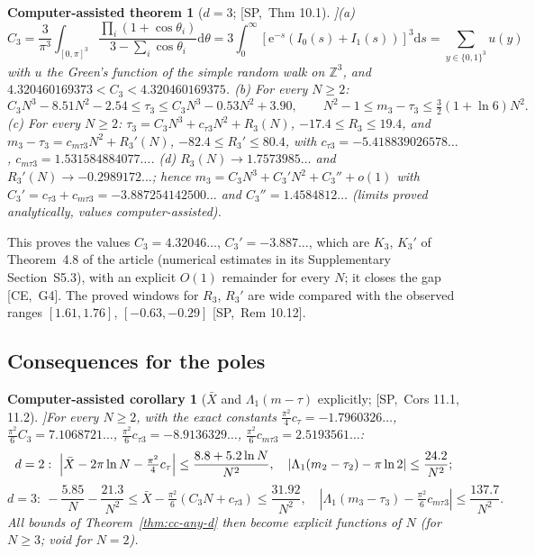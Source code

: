 \documentclass[10pt,a4paper]{article}
\theoremstyle{plain}
\newtheorem{catheorem}[theorem]{Computer-assisted theorem}
\newtheorem{cacorollary}[theorem]{Computer-assisted corollary}
\theoremstyle{definition}
\newcommand{\src}[2]{[\textsf{#1},~#2]}           %
\newcommand{\SPE}{\textsf{SP}}
\newcommand{\CER}{\textsf{CE}}
\newcommand{\Z}{\mathbb{Z}}
\newcommand{\ee}{\mathrm{e}}
\newcommand{\dd}{\mathrm{d}}
\newcommand{\Xb}{\bar X}
\begin{document}
\begin{catheorem}[$d=3$; \src{\SPE}{Thm 10.1}]\label{thm:d3}
(a)
\[C_3=\frac3{\pi^3}\int_{[0,\pi]^3}\frac{\prod_i(1+\cos\theta_i)}{3-\sum_i\cos\theta_i}\dd\theta=3\int_0^\infty[\ee^{-s}(I_0(s)+I_1(s))]^3\dd s=\sum_{y\in\{0,1\}^3}u(y)\]
with $u$ the Green's function of the simple random walk on $\Z^3$, and $4.320460169373<C_3<4.320460169375$.
(b) For every $N\ge2$:
\[C_3N^3-8.51N^2-2.54\le\tau_3\le C_3N^3-0.53N^2+3.90,\qquad N^2-1\le m_3-\tau_3\le\tfrac32(1+\ln6)N^2.\]
(c) For every $N\ge2$: $\tau_3=C_3N^3+c_{\tau3}N^2+R_3(N)$, $-17.4\le R_3\le19.4$, and $m_3-\tau_3=c_{m\tau3}N^2+R_3'(N)$, $-82.4\le R_3'\le80.4$, with $c_{\tau3}=-5.418839026578\ldots$, $c_{m\tau3}=1.531584884077\ldots$.
(d) $R_3(N)\to1.7573985\ldots$ and $R_3'(N)\to-0.2989172\ldots$; hence $m_3=C_3N^3+C_3'N^2+C_3''+o(1)$ with $C_3'=c_{\tau3}+c_{m\tau3}=-3.887254142500\ldots$ and $C_3''=1.4584812\ldots$ (limits proved analytically, values computer-assisted).
\end{catheorem}
This proves the values $C_3=4.32046\ldots$, $C_3'=-3.887\ldots$, which are $K_3$, $K_3'$ of Theorem~4.8 of the article (numerical estimates in its Supplementary Section~S5.3), with an explicit $O(1)$ remainder for every $N$; it closes the gap \src{\CER}{G4}. The proved windows for $R_3$, $R_3'$ are wide compared with the observed ranges $[1.61,1.76]$, $[-0.63,-0.29]$ \src{\SPE}{Rem 10.12}.

\subsection{Consequences for the poles}

\begin{cacorollary}[$\Xb$ and $\Lambda_1(m-\tau)$ explicitly; \src{\SPE}{Cors 11.1, 11.2}]\label{cor:Xbar}
For every $N\ge2$, with the exact constants $\frac{\pi^2}4c_\tau=-1.7960326\ldots$, $\frac{\pi^2}6C_3=7.1068721\ldots$, $\frac{\pi^2}6c_{\tau3}=-8.9136329\ldots$, $\frac{\pi^2}6c_{m\tau3}=2.5193561\ldots$:
\[
d=2:\ \Bigl|\Xb-2\pi\ln N-\tfrac{\pi^2}4c_\tau\Bigr|\le\frac{8.8+5.2\ln N}{N^2},\quad|\Lambda_1(m_2-\tau_2)-\pi\ln2|\le\frac{24.2}{N^2};
\]
\[
d=3:\ -\frac{5.85}N-\frac{21.3}{N^2}\le\Xb-\tfrac{\pi^2}6(C_3N+c_{\tau3})\le\frac{31.92}{N^2},\quad|\Lambda_1(m_3-\tau_3)-\tfrac{\pi^2}6c_{m\tau3}|\le\frac{137.7}{N^2}.
\]
All bounds of Theorem~\ref{thm:cc-any-d} then become explicit functions of $N$ (for $N\ge3$; void for $N=2$).
\end{cacorollary}
\end{document}
